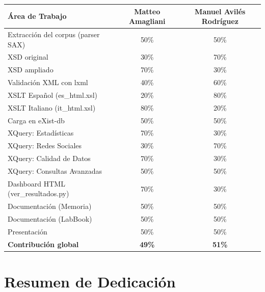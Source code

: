 \documentclass[11pt,a4paper]{article}
\begin{document}
\begin{table}[H]
\centering
\renewcommand{\arraystretch}{1.3}
\begin{tabularx}{\textwidth}{Xcc}
\toprule
\textbf{\'Area de Trabajo} & \textbf{Matteo Amagliani} & \textbf{Manuel Avil\'es Rodr\'iguez} \\
\midrule
Extracci\'on del corpus (parser SAX)      & 50\% & 50\% \\
XSD original                              & 30\% & 70\% \\
XSD ampliado                              & 70\% & 30\% \\
Validaci\'on XML con lxml                 & 40\% & 60\% \\
XSLT Espa\~nol (es\_html.xsl)            & 20\% & 80\% \\
XSLT Italiano (it\_html.xsl)             & 80\% & 20\% \\
Carga en eXist-db                         & 50\% & 50\% \\
XQuery: Estad\'isticas                    & 70\% & 30\% \\
XQuery: Redes Sociales                    & 30\% & 70\% \\
XQuery: Calidad de Datos                  & 70\% & 30\% \\
XQuery: Consultas Avanzadas               & 50\% & 50\% \\
Dashboard HTML (ver\_resultados.py)       & 70\% & 30\% \\
Documentaci\'on (Memoria)                 & 50\% & 50\% \\
Documentaci\'on (LabBook)                 & 50\% & 50\% \\
Presentaci\'on                            & 50\% & 50\% \\
\midrule
\textbf{Contribuci\'on global}            & \textbf{49\%} & \textbf{51\%} \\
\bottomrule
\end{tabularx}
\end{table}

\section*{Resumen de Dedicaci\'on}
\end{document}
